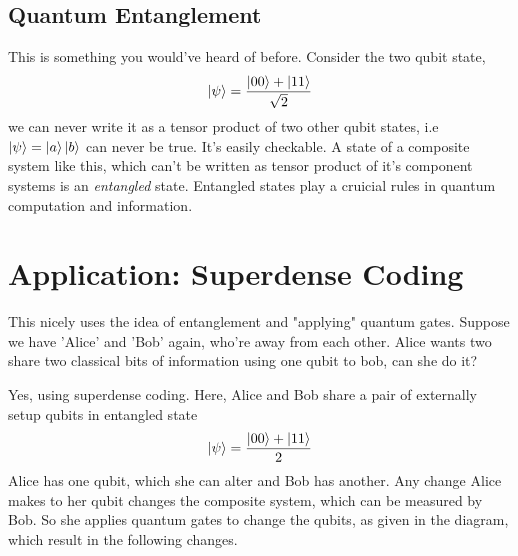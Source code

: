 \subsection*{Quantum Entanglement}
This is something you would've heard of before. Consider the two qubit state,
\begin{align}
    \ket{\psi} = \frac{\ket{00} + \ket{11}}{\sqrt{2}}
\end{align}
we can never write it as a tensor product of two other qubit states, i.e $\ket{\psi} = \ket{a}\ket{b}$ can never be true. It's easily checkable. A state of a composite system like this, which can't be written as tensor product of it's component systems is an \textit{entangled} state. Entangled states play a cruicial rules in quantum computation and information.

\section{Application: Superdense Coding}
This nicely uses the idea of entanglement and "applying" quantum gates.
Suppose we have 'Alice' and 'Bob' again, who're away from each other. Alice wants two share two classical bits of information using one qubit to bob, can she do it?

\begin{center}
\end{center}

Yes, using superdense coding. Here, Alice and Bob share a pair of externally setup qubits in entangled state
\begin{equation}
   \ket{\psi} =  \frac{\ket{00}+\ket{11}}{2}
\end{equation}
Alice has one qubit, which she can alter and Bob has another. Any change Alice makes to her qubit changes the composite system, which can be measured by Bob. So she applies quantum gates to change the qubits, as given in the diagram, which result in the following changes.

